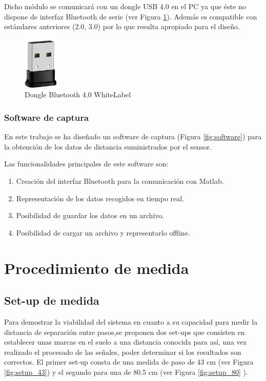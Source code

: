 		Dicho módulo se comunicará con un dongle USB 4.0 en el PC ya que éste no dispone de interfaz Bluetooth de serie (ver Figura \ref{fig:dongle}). Además es compatible con estándares anteriores (2.0, 3.0) por lo que resulta apropiado para el diseño.
		
		
		\begin{figure}[H]
			\centering
			\includegraphics[width=0.15\textwidth]{./graphics/dongle}
			\caption{Dongle Bluetooth 4.0 WhiteLabel} \label{fig:dongle}
		\end{figure}
			
		\subsubsection{Software de captura}
		
		En este trabajo se ha diseñado un software de captura (Figura \ref{fig:software}) para la obtención de los datos de distancia suministrados por el sensor.
		

		Las funcionalidades principales de este software son:
		\begin{enumerate}
				\item Creación del interfaz Bluetooth para la comunicación con Matlab. 
				\item Representación de los datos recogidos en tiempo real.
				\item Posibilidad de guardar los datos en un archivo.
				\item Posibilidad de cargar un archivo y representarlo offline.
		\end{enumerate}
	
		
\section{Procedimiento de medida}		

\subsection{Set-up de medida}
Para demostrar la viabilidad del sistema en cuanto a su capacidad para medir la distancia de separación entre pasos,se proponen dos set-ups que consisten en establecer unas marcas en el suelo a una distancia conocida para así, una vez realizado el procesado de las señales, poder determinar si los resultados son correctos. El primer set-up consta de una medida de paso de 43 cm (ver Figura \ref{fig:setup_43}) y el segundo para una de 80.5 cm (ver Figura  \ref{fig:setup_80} ). 

